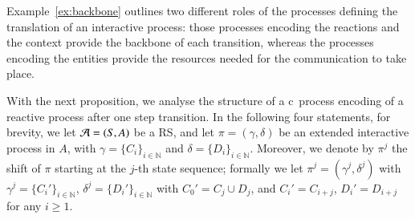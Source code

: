 %
%

Example~\ref{ex:backbone}   outlines two different roles of the processes defining the translation of an interactive process: those processes encoding the reactions and the context provide the backbone of each transition, whereas the processes encoding the entities provide the resources needed for the communication to take place.
 
With the next proposition, we analyse the structure of a c\CNA \ 
process encoding of  a reactive process after one step transition.
In the following four statements, for brevity, we let ${\cal A} = (S, A)$ be a RS, and let  $\pi=(\gamma,\delta)$ be an extended interactive process in $A$, with $\gamma=\{C_i\}_{i\in\mathbb{N}}$ and $\delta=\{D_i\}_{i\in\mathbb{N}}$. Moreover, we denote by $\pi^j$ the shift of $\pi$ starting at the $j$-th state sequence; formally we let $\pi^j=(\gamma^j,\delta^j)$ with
$\gamma^j=\{C_i'\}_{i\in\mathbb{N}}$, $\delta^j=\{D_i'\}_{i\in\mathbb{N}}$ with 
  $C_0'=C_j \cup D_j$, and   $C_i'=C_{i+j}$, $D_i'= D_{i+j}$ for any $i\geq 1$.

